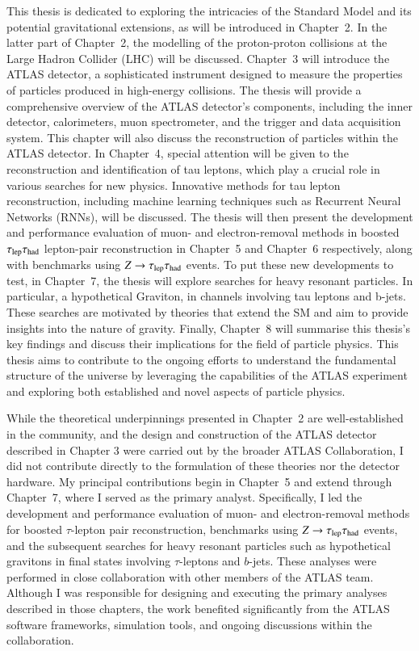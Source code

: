 This thesis is dedicated to exploring the intricacies of the Standard Model and its potential gravitational extensions, as will be introduced in Chapter~2.
In the latter part of Chapter~2, the modelling of the proton-proton collisions at the Large Hadron Collider (LHC) will be discussed.
Chapter~3 will introduce the ATLAS detector, a sophisticated instrument designed to measure the 
properties of particles produced in high-energy collisions. The thesis will provide a comprehensive 
overview of the ATLAS detector's components, including the inner detector, calorimeters, muon 
spectrometer, and the trigger and data acquisition system. This chapter will also discuss the
reconstruction of particles within the ATLAS detector. 
In Chapter~4, special attention will be given to the reconstruction and identification of tau leptons, which 
play a crucial role in various searches for new physics. Innovative methods for tau lepton reconstruction, 
including machine learning techniques such as Recurrent Neural Networks (RNNs), will be discussed. 
The thesis will then present the development and performance evaluation of muon- and electron-removal 
methods in boosted $\tau_\mathrm{lep}\tau_\mathrm{had}$ lepton-pair reconstruction in Chapter~5 and Chapter~6
respectively, along with benchmarks using $Z\rightarrow\tau_{\text{lep}}\tau_{\text{had}}$ events.
To put these new developments to test, in Chapter~7, the thesis will explore searches for heavy resonant particles. In particular, a hypothetical Graviton, 
in channels involving tau leptons and b-jets. These searches are motivated by theories that extend the SM and aim to provide insights into the nature of gravity.
Finally, Chapter~8 will summarise this thesis's key findings and discuss their implications for the field of particle physics.
This thesis aims to contribute to the ongoing efforts to understand the fundamental 
structure of the universe by leveraging the capabilities of the ATLAS experiment and exploring 
both established and novel aspects of particle physics.

While the theoretical underpinnings presented in Chapter~2 are well-established in the community, 
and the design and construction of the ATLAS detector described in Chapter 3 were carried out 
by the broader ATLAS Collaboration, I did not contribute directly to the formulation of these 
theories nor the detector hardware. 
My principal contributions begin in Chapter~5 and extend through Chapter~7, where I served as 
the primary analyst. Specifically, I led the development and performance evaluation of 
muon- and electron-removal methods for boosted $\tau$-lepton pair reconstruction, 
benchmarks using $Z\rightarrow\tau_{\text{lep}}\tau_{\text{had}}$ events, and the subsequent searches for heavy resonant 
particles such as hypothetical gravitons in final states involving $\tau$-leptons and 
$b$-jets. These analyses were performed in close collaboration with other members of 
the ATLAS team.
Although I was responsible for designing and executing the primary analyses described 
in those chapters, the work benefited significantly from the ATLAS software frameworks, 
simulation tools, and ongoing discussions within the collaboration.